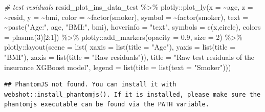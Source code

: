 \documentclass[
]{book}
\newenvironment{Shaded}{\begin{snugshade}}{\end{snugshade}}
\newcommand{\AttributeTok}[1]{\textcolor[rgb]{0.77,0.63,0.00}{#1}}
\newcommand{\CommentTok}[1]{\textcolor[rgb]{0.56,0.35,0.01}{\textit{#1}}}
\newcommand{\DecValTok}[1]{\textcolor[rgb]{0.00,0.00,0.81}{#1}}
\newcommand{\FloatTok}[1]{\textcolor[rgb]{0.00,0.00,0.81}{#1}}
\newcommand{\FunctionTok}[1]{\textcolor[rgb]{0.00,0.00,0.00}{#1}}
\newcommand{\NormalTok}[1]{#1}
\newcommand{\SpecialCharTok}[1]{\textcolor[rgb]{0.00,0.00,0.00}{#1}}
\newcommand{\StringTok}[1]{\textcolor[rgb]{0.31,0.60,0.02}{#1}}
\begin{document}
\begin{Shaded}
\begin{Highlighting}[]
\CommentTok{\# test residuals}
\NormalTok{resid\_plot\_ins\_data\_test }\SpecialCharTok{\%\textgreater{}\%}
\NormalTok{  plotly}\SpecialCharTok{::}\FunctionTok{plot\_ly}\NormalTok{(}\AttributeTok{x =} \SpecialCharTok{\textasciitilde{}}\NormalTok{age, }\AttributeTok{z =} \SpecialCharTok{\textasciitilde{}}\NormalTok{resid, }\AttributeTok{y =} \SpecialCharTok{\textasciitilde{}}\NormalTok{bmi,}
                  \AttributeTok{color =} \SpecialCharTok{\textasciitilde{}}\FunctionTok{factor}\NormalTok{(smoker),}
                  \AttributeTok{symbol =} \SpecialCharTok{\textasciitilde{}}\FunctionTok{factor}\NormalTok{(smoker),}
                  \AttributeTok{text =} \SpecialCharTok{\textasciitilde{}}\FunctionTok{paste}\NormalTok{(}\StringTok{"Age:"}\NormalTok{, age, }\StringTok{"BMI:"}\NormalTok{, bmi),}
                  \AttributeTok{hoverinfo =} \StringTok{"text"}\NormalTok{,}
                  \AttributeTok{symbols =} \FunctionTok{c}\NormalTok{(}\StringTok{\textquotesingle{}x\textquotesingle{}}\NormalTok{,}\StringTok{\textquotesingle{}circle\textquotesingle{}}\NormalTok{),}
                  \AttributeTok{colors =} \FunctionTok{plasma}\NormalTok{(}\DecValTok{3}\NormalTok{)[}\DecValTok{2}\SpecialCharTok{:}\DecValTok{1}\NormalTok{]) }\SpecialCharTok{\%\textgreater{}\%}
\NormalTok{  plotly}\SpecialCharTok{::}\FunctionTok{add\_markers}\NormalTok{(}\AttributeTok{opacity =} \FloatTok{0.9}\NormalTok{,}
                      \AttributeTok{size =} \DecValTok{2}\NormalTok{) }\SpecialCharTok{\%\textgreater{}\%}
\NormalTok{  plotly}\SpecialCharTok{::}\FunctionTok{layout}\NormalTok{(}\AttributeTok{scene =} \FunctionTok{list}\NormalTok{(}
    \AttributeTok{xaxis =} \FunctionTok{list}\NormalTok{(}\AttributeTok{title =} \StringTok{"Age"}\NormalTok{),}
    \AttributeTok{yaxis =} \FunctionTok{list}\NormalTok{(}\AttributeTok{title =} \StringTok{"BMI"}\NormalTok{),}
    \AttributeTok{zaxis =} \FunctionTok{list}\NormalTok{(}\AttributeTok{title =} \StringTok{"Raw residuals"}\NormalTok{)),}
    \AttributeTok{title =} \StringTok{"Raw test residuals of the insurance XGBoost model"}\NormalTok{,}
    \AttributeTok{legend =} \FunctionTok{list}\NormalTok{(}\AttributeTok{title =} \FunctionTok{list}\NormalTok{(}\AttributeTok{text =} \StringTok{"Smoker"}\NormalTok{)))}
\end{Highlighting}
\end{Shaded}

\begin{verbatim}
## PhantomJS not found. You can install it with webshot::install_phantomjs(). If it is installed, please make sure the phantomjs executable can be found via the PATH variable.
\end{verbatim}
\end{document}
